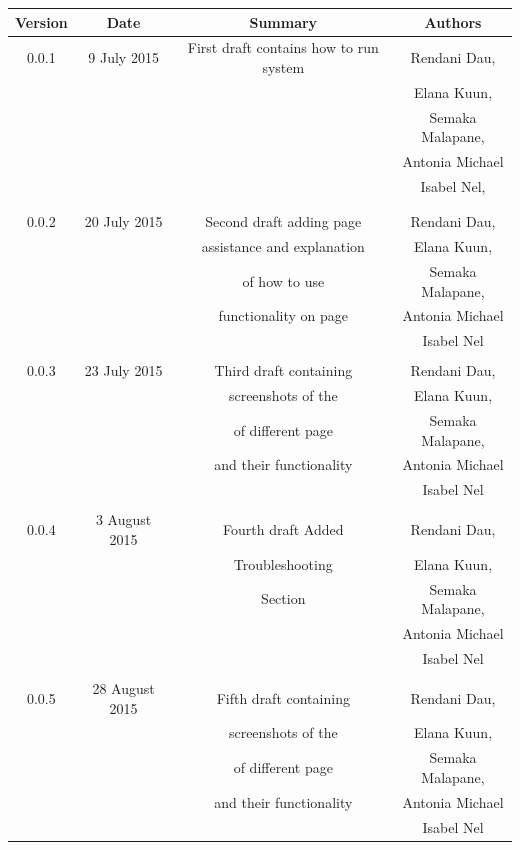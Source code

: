 \documentclass[a4paper,12pt]{report}
\begin{document}
\begin{table}[h!]
\centering
 \begin{tabular}{||c c c c||} 
 \hline
 \textbf{Version} & \textbf{Date} & \textbf{Summary} & \textbf{Authors} \\ [0.5ex] 
 \hline\hline
 0.0.1 & 9 July 2015 &  First draft contains how to run system  & Rendani Dau, \\ & & & Elana Kuun, \\ & & & Semaka Malapane, \\ & & & Antonia Michael \\ & & & Isabel Nel, \\ & & & \\
 \hline 
 & & & \\
 0.0.2 & 20 July 2015 &  Second draft adding page  & Rendani Dau, \\ & & assistance and explanation & Elana Kuun, \\ & & of how to use & Semaka Malapane, \\ & & functionality on page &  Antonia Michael \\ & & & Isabel Nel \\   [1ex]  
 \hline 
 & & & \\
 0.0.3& 23 July 2015 &  Third draft containing  & Rendani Dau, \\ & & screenshots of the & Elana Kuun, \\ & & of different page & Semaka Malapane, \\ & & and their functionality &  Antonia Michael \\ & & & Isabel Nel \\   [1ex]  
 \hline
 & & & \\
 0.0.4& 3 August 2015 &  Fourth draft Added  & Rendani Dau, \\ & & Troubleshooting & Elana Kuun, \\ & & Section & Semaka Malapane, \\ & &  &  Antonia Michael \\ & & & Isabel Nel \\   [1ex]  
  \hline 
 & & & \\
 0.0.5& 28 August 2015 &  Fifth draft containing  & Rendani Dau, \\ & & screenshots of the & Elana Kuun, \\ & & of different page & Semaka Malapane, \\ & & and their functionality &  Antonia Michael \\ & & & Isabel Nel \\   [1ex]  

\end{tabular}
\end{table}
\end{document}
